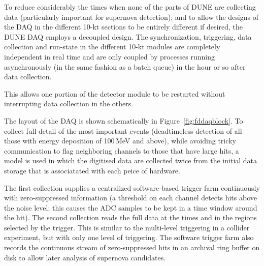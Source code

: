 To reduce considerably the times when none of the parts of DUNE are
collecting data (particularly important for supernova detection); and
to allow the designs of the DAQ in the different 10-kt sections to be
entirely different if desired, the DUNE DAQ employs a decoupled 
design. The synchronization, triggering, data collection and run-state in the
different 10-kt modules are completely independent in real time and
are only coupled by processes running asynchronously (in the same fashion
as a batch queue) in the hour or so after data collection.

This allows one portion of the detector module to be restarted without interrupting
data collection in the others.

The layout of the DAQ is shown schematically in
Figure~\ref{fig:fddaqblock}.  To collect full detail of the
most important events (deadtimeless detection of all those with energy
deposition of 100\,MeV and above), while avoiding tricky communication
to flag neighboring channels to those that have large hits, a model is used
in which the digitised data are collected twice from the initial data
storage that is associatated with each peice of hardware. 


The first collection supplies a centralized software-based trigger farm continuously with
zero-suppressed information (a threshold on each channel detects hits above the noise level;
this causes the ADC samples to be kept in a time window around the hit).  
The second collection reads the full data at the times and in the regions %
selected by the trigger. This is similar to the multi-level triggering in a collider experiment,
but with only one level of triggering. The software trigger farm also
records the continuous stream of zero-suppressed hits in an archival
ring buffer on disk to allow later analysis of supernova candidates.


